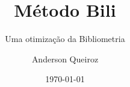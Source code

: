 \documentclass{beamer}
\author{Anderson Queiroz}
\title{Método Bili}
\subtitle[]{Uma otimização da Bibliometria}
\date{\today}
\begin{document}
\begin{frame}
\titlepage
\begin{figure}
    
\end{figure}
\end{frame}






\end{document}
